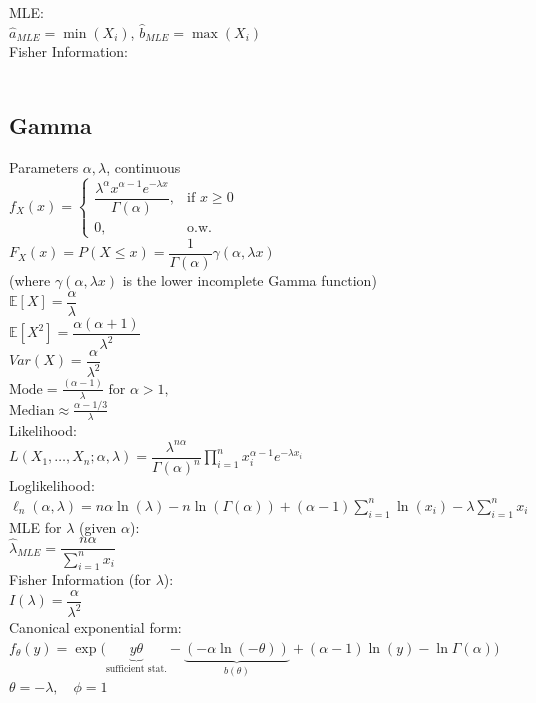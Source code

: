 MLE:\\
$\hat{a}_{MLE} = \min(X_i)$,\quad
$\hat{b}_{MLE} = \max(X_i)$\\[6pt]

Fisher Information:\\
\\

\subsection*{Gamma}
Parameters $\alpha, \lambda$, continuous\\
$ f_X(x)=
	\begin{cases}
		\dfrac{\lambda^{\alpha} x^{\alpha-1} e^{-\lambda x}}{\Gamma(\alpha)}, & \text{if } x \ge 0 \\
		0, & \text{o.w.}
	\end{cases}
$\\[6pt]
$F_X(x)= P(X \le x)= \dfrac{1}{\Gamma(\alpha)} \gamma(\alpha, \lambda x)$\\
(where $\gamma(\alpha, \lambda x)$ is the lower incomplete Gamma function)\\[6pt]
$\mathbb{E}[X]=\dfrac{\alpha}{\lambda}$\\
$\mathbb{E}[X^2]=\dfrac{\alpha(\alpha+1)}{\lambda^2}$\\
$Var(X)=\dfrac{\alpha}{\lambda^2}$\\
$\text{Mode} = \frac{(\alpha - 1)}{\lambda} \text{ for } \alpha > 1,\quad$\\
$\text{Median} \approx \frac{\alpha - 1/3}{\lambda}$\\

Likelihood:\\
$L(X_1,\dots,X_n;\alpha,\lambda)=
	\dfrac{\lambda^{n\alpha}}{\Gamma(\alpha)^n}
	\prod_{i=1}^n x_i^{\alpha-1} e^{-\lambda x_i}$\\[6pt]
Loglikelihood:\\
$\ell_n(\alpha,\lambda)= n\alpha \ln(\lambda) - n \ln(\Gamma(\alpha))
+ (\alpha-1)\sum_{i=1}^n \ln(x_i) - \lambda \sum_{i=1}^n x_i$\\[6pt]
MLE for $\lambda$ (given $\alpha$):\\
$\hat{\lambda}_{MLE} = \dfrac{n\alpha}{\sum_{i=1}^n x_i}$\\[6pt]
Fisher Information (for $\lambda$):\\
$I(\lambda)=\dfrac{\alpha}{\lambda^2}$\\[6pt]
Canonical exponential form:\\
$f_{\theta}(y)=\exp\big(\underbrace{y\theta}_{\text{sufficient stat.}} - 
\underbrace{(-\alpha\ln(-\theta))}_{b(\theta)} + 
(\alpha-1)\ln(y) - \ln\Gamma(\alpha)\big)$\\
$\theta = -\lambda,\quad \phi=1$\\

